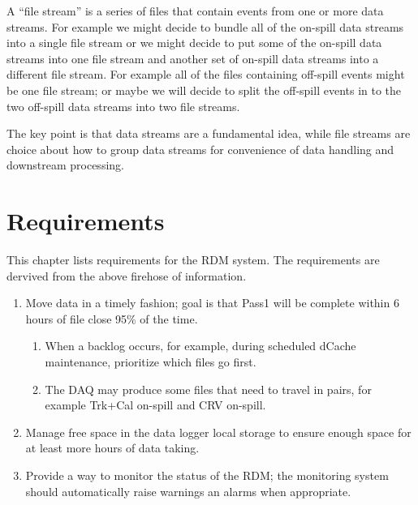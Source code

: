 A ``file stream'' is a series of files that contain events from one or more data streams.
For example we might decide to bundle all of the on-spill data streams into a single
file stream or we might decide to put some of the on-spill data streams into one file
stream and another set of on-spill data streams into a different file stream.
For example all of the files containing off-spill events might be one file stream;
or maybe we will decide to split the off-spill events in to
the two off-spill data streams into two file streams.

The key point is that data streams are a fundamental idea,
while file streams are choice about how to group data streams for convenience of data handling and downstream processing.



\chapter{Requirements}

This chapter lists requirements for the RDM system.
The requirements are dervived from the above firehose of information.

\begin{enumerate}
  \item Move data in a timely fashion; goal is that Pass1 will be complete within 6 hours of file close 95\% of the time.
  \begin{enumerate}
    \item When a backlog occurs, for example, during scheduled dCache maintenance, prioritize which files go first.
    \item The DAQ may produce some files that need to travel in pairs, for example Trk+Cal on-spill and CRV on-spill.
  \end{enumerate}
\item Manage free space in the data logger local storage to ensure enough space for at least  more
  hours of data taking.
\item Provide a way to monitor the status of the RDM;
  the monitoring system should automatically raise warnings an alarms when appropriate.
\end{enumerate}

